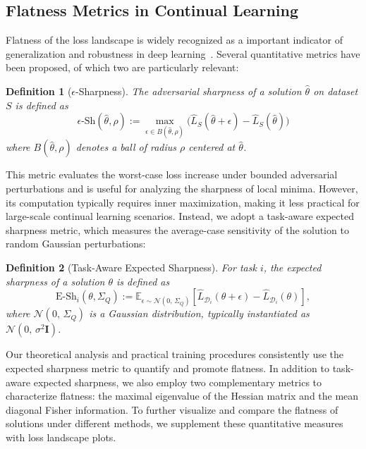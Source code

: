 \documentclass[letterpaper]{article} %
\newtheorem{definition}{Definition}
\begin{document}
\subsection{Flatness Metrics in Continual Learning}


Flatness of the loss landscape is widely recognized as a important indicator of generalization and robustness in deep learning~\citep{liVisualizingLossLandscape2018, foretSharpnessAwareMinimizationEfficiently2021}. Several quantitative metrics have been proposed, of which two are particularly relevant:

\begin{definition}[$\epsilon$-Sharpness]
The adversarial sharpness of a solution $\hat{\theta}$ on dataset $S$ is defined as
\begin{equation}
    \epsilon\text{-Sh}(\hat{\theta}, \rho) :=\max_{\epsilon \in B(\hat\theta, \rho)} \big( \hat{L}_{S}(\hat{\theta} + \epsilon) - \hat{L}_{S}(\hat{\theta}) \big)
\end{equation}
where $B(\hat\theta, \rho)$ denotes a ball of radius $\rho$ centered at $\hat\theta$.
\end{definition}

This metric evaluates the worst-case loss increase under bounded adversarial perturbations and is useful for analyzing the sharpness of local minima. However, its computation typically requires inner maximization, making it less practical for large-scale continual learning scenarios. Instead, we adopt a task-aware expected sharpness metric, which measures the average-case sensitivity of the solution to random Gaussian perturbations:

\begin{definition}[Task-Aware Expected Sharpness]
For task $i$, the expected sharpness of a solution $\theta$ is defined as
\begin{equation}
    \mathrm{E\text{-}Sh}_i(\theta, \Sigma_Q) := \mathbb{E}_{\epsilon \sim \mathcal{N}(0,\,\Sigma_Q)} \left[ \hat{L}_{\mathcal{D}_i}(\theta + \epsilon) - \hat{L}_{\mathcal{D}_i}(\theta) \right],
\end{equation}
where $\mathcal{N}(0,\,\Sigma_Q)$ is a Gaussian distribution, typically instantiated as $\mathcal{N}(0,\, \sigma^2 \mathbf{I})$.
\end{definition}

Our theoretical analysis and practical training procedures consistently use the expected sharpness metric to quantify and promote flatness. In addition to task-aware expected sharpness, we also employ two complementary metrics to characterize flatness: the maximal eigenvalue of the Hessian matrix  and the mean diagonal Fisher information. To further visualize and compare the flatness of solutions under different methods, we supplement these quantitative measures with loss landscape plots.
\end{document}
